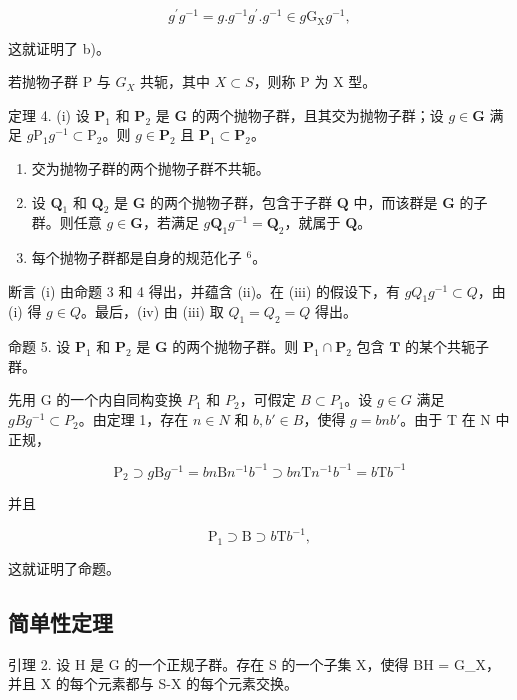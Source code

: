 \[
g ^ {\prime} g ^ {- 1} = g. g ^ {- 1} g ^ {\prime}. g ^ {- 1} \in g \mathrm{G} _ {\mathrm{X}} g ^ {- 1},
\]

这就证明了 b)。

若抛物子群 P 与 \(G_{X}\) 共轭，其中 \(X \subset S\)，则称 P 为 X 型。

定理 4. (i) 设 \(\mathbf{P}_1\) 和 \(\mathbf{P}_2\) 是 \(\mathbf{G}\) 的两个抛物子群，且其交为抛物子群；设 \(g \in \mathbf{G}\) 满足 \(g\mathrm{P}_1g^{-1} \subset \mathrm{P}_2\)。则 \(g \in \mathbf{P}_2\) 且 \(\mathbf{P}_1 \subset \mathbf{P}_2\)。

\begin{enumerate}
\def\labelenumi{(\roman{enumi})}
\setcounter{enumi}{1}
\item
  交为抛物子群的两个抛物子群不共轭。
\item
  设 \(\mathbf{Q}_1\) 和 \(\mathbf{Q}_2\) 是 \(\mathbf{G}\) 的两个抛物子群，包含于子群 \(\mathbf{Q}\) 中，而该群是 \(\mathbf{G}\) 的子群。则任意 \(g \in \mathbf{G}\)，若满足 \(g\mathbf{Q}_1g^{-1} = \mathbf{Q}_2\)，就属于 \(\mathbf{Q}\)。
\item
  每个抛物子群都是自身的规范化子 \(^{6}\)。
\end{enumerate}

断言 (i) 由命题 3 和 4 得出，并蕴含 (ii)。在 (iii) 的假设下，有 \(gQ_{1}g^{-1} \subset Q\)，由 (i) 得 \(g \in Q\)。最后，(iv) 由 (iii) 取 \(Q_{1} = Q_{2} = Q\) 得出。

命题 5. 设 \(\mathbf{P}_1\) 和 \(\mathbf{P}_2\) 是 \(\mathbf{G}\) 的两个抛物子群。则 \(\mathbf{P}_1 \cap \mathbf{P}_2\) 包含 \(\mathbf{T}\) 的某个共轭子群。

先用 G 的一个内自同构变换 \(P_{1}\) 和 \(P_{2}\)，可假定 \(B \subset P_{1}\)。设 \(g \in G\) 满足 \(gBg^{-1} \subset P_{2}\)。由定理 1，存在 \(n \in N\) 和 \(b, b' \in B\)，使得 \(g = bnb'\)。由于 T 在 N 中正规，

\[
\mathrm{P} _ {2} \supset g \mathrm{B} g ^ {- 1} = b n \mathrm{B} n ^ {- 1} b ^ {- 1} \supset b n \mathrm{T} n ^ {- 1} b ^ {- 1} = b \mathrm{T} b ^ {- 1}
\]

并且

\[
\mathrm{P} _ {1} \supset \mathrm{B} \supset b \mathrm{T} b ^ {- 1},
\]

这就证明了命题。

\subsection{简单性定理}

引理 2. 设 H 是 G 的一个正规子群。存在 S 的一个子集 X，使得 BH = G\_X，并且 X 的每个元素都与 S-X 的每个元素交换。

